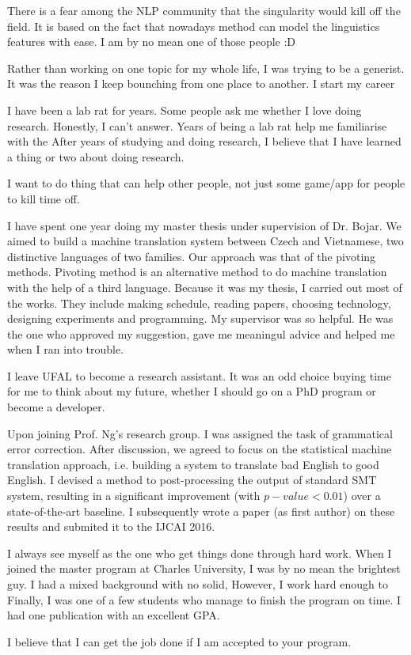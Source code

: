 \documentclass[a4paper, 12pt]{scrartcl}
\begin{document}
There is a fear among the NLP community that the singularity would kill off the field. 
It is based on the fact that nowadays method can model the linguistics features with ease. 
I am by no mean one of those people :D


Rather than working on one topic for my whole life, I was trying to be a generist. 
It was the reason I keep bounching from one place to another. I start my career 

I have been a lab rat for years. 
Some people ask me whether I love doing research. Honestly, I can't answer. 
Years of being a lab rat help me familiarise with the 
After years of studying and doing research, I believe that I have learned a thing or two about doing research. 

I want to do thing that can help other people, not just some game/app for people to kill time off. 
 

I have spent one year doing my master thesis under supervision of Dr. Bojar. 
We aimed to build a machine translation system between Czech and Vietnamese, two distinctive languages of two families. 
Our approach was that of the pivoting methods.
Pivoting method is an alternative method to do machine translation with the help of a third language. 
Because it was my thesis, I carried out most of the works. They include making schedule, reading papers, choosing technology, designing experiments and programming.
My supervisor was so helpful. 
He was the one who approved my suggestion, gave me meaningul advice and helped me when I ran into trouble. 




I leave UFAL to become a research assistant. 
It was an odd choice buying time for me to think about my future, whether I should go on a PhD program or become a developer. 



Upon joining Prof. Ng's research group. I was assigned the task of grammatical error correction.
After discussion, we agreed to focus on the statistical machine translation approach, i.e. building a system to translate bad English to good English. 
I devised a method to post-processing the output of standard SMT system, resulting in a significant improvement (with $p-value < 0.01$) over a state-of-the-art baseline. 
I subsequently wrote a paper (as first author) on these results and submited it to the IJCAI 2016.  


I always see myself as the one who get things done through hard work. 
When I joined the master program at Charles University, I was by no mean the brightest guy. 
I had a mixed background with no solid, 
However, I work hard enough to 
Finally, I was one of a few students who manage to finish the program on time. 
I had one publication with an excellent GPA. 

I believe that I can get the job done if I am accepted to your program.
\end{document}
